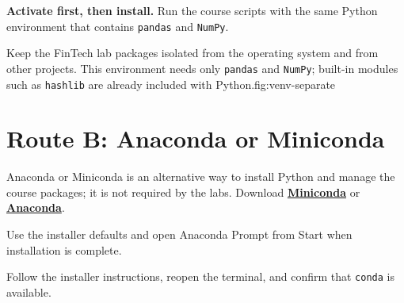 \begin{keyidea}
\textbf{Activate first, then install.} Run the course scripts with the same
Python environment that contains \texttt{pandas} and \texttt{NumPy}.
\end{keyidea}

\begin{utpfig}{Keep the FinTech lab packages isolated from the operating system and from other projects. This environment needs only \texttt{pandas} and \texttt{NumPy}; built-in modules such as \texttt{hashlib} are already included with Python.}{fig:venv-separate}
\end{utpfig}

\section{Route B: Anaconda or Miniconda}

Anaconda or Miniconda is an alternative way to install Python and manage the
course packages; it is not required by the labs. Download
\href{https://docs.anaconda.com/miniconda/}{\textbf{Miniconda}} or
\href{https://www.anaconda.com/download}{\textbf{Anaconda}}.

\begin{description}[leftmargin=1.15in,style=nextline]
  \item[Windows] Use the installer defaults and open Anaconda Prompt from
    Start when installation is complete.
  \item[macOS / Linux] Follow the installer instructions, reopen the
    terminal, and confirm that \texttt{conda} is available.
\end{description}

